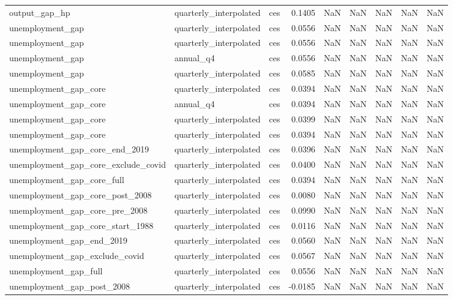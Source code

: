 \begin{tabular}{lllrrrrrr}
output\_gap\_hp & quarterly\_interpolated & ces & 0.1405 & NaN & NaN & NaN & NaN & NaN \\
unemployment\_gap & quarterly\_interpolated & ces & 0.0556 & NaN & NaN & NaN & NaN & NaN \\
unemployment\_gap & quarterly\_interpolated & ces & 0.0556 & NaN & NaN & NaN & NaN & NaN \\
unemployment\_gap & annual\_q4 & ces & 0.0556 & NaN & NaN & NaN & NaN & NaN \\
unemployment\_gap & quarterly\_interpolated & ces & 0.0585 & NaN & NaN & NaN & NaN & NaN \\
unemployment\_gap\_core & quarterly\_interpolated & ces & 0.0394 & NaN & NaN & NaN & NaN & NaN \\
unemployment\_gap\_core & annual\_q4 & ces & 0.0394 & NaN & NaN & NaN & NaN & NaN \\
unemployment\_gap\_core & quarterly\_interpolated & ces & 0.0399 & NaN & NaN & NaN & NaN & NaN \\
unemployment\_gap\_core & quarterly\_interpolated & ces & 0.0394 & NaN & NaN & NaN & NaN & NaN \\
unemployment\_gap\_core\_end\_2019 & quarterly\_interpolated & ces & 0.0396 & NaN & NaN & NaN & NaN & NaN \\
unemployment\_gap\_core\_exclude\_covid & quarterly\_interpolated & ces & 0.0400 & NaN & NaN & NaN & NaN & NaN \\
unemployment\_gap\_core\_full & quarterly\_interpolated & ces & 0.0394 & NaN & NaN & NaN & NaN & NaN \\
unemployment\_gap\_core\_post\_2008 & quarterly\_interpolated & ces & 0.0080 & NaN & NaN & NaN & NaN & NaN \\
unemployment\_gap\_core\_pre\_2008 & quarterly\_interpolated & ces & 0.0990 & NaN & NaN & NaN & NaN & NaN \\
unemployment\_gap\_core\_start\_1988 & quarterly\_interpolated & ces & 0.0116 & NaN & NaN & NaN & NaN & NaN \\
unemployment\_gap\_end\_2019 & quarterly\_interpolated & ces & 0.0560 & NaN & NaN & NaN & NaN & NaN \\
unemployment\_gap\_exclude\_covid & quarterly\_interpolated & ces & 0.0567 & NaN & NaN & NaN & NaN & NaN \\
unemployment\_gap\_full & quarterly\_interpolated & ces & 0.0556 & NaN & NaN & NaN & NaN & NaN \\
unemployment\_gap\_post\_2008 & quarterly\_interpolated & ces & -0.0185 & NaN & NaN & NaN & NaN & NaN \\

\end{tabular}
